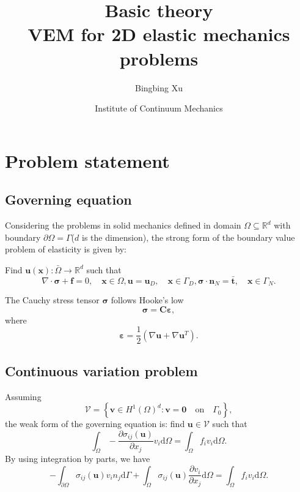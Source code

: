 \documentclass[kulak]{kulakarticle} %
\title{Basic theory\\ VEM for 2D elastic mechanics problems}
\author{Bingbing Xu}
\date{Institute of Continuum Mechanics}
\newcommand{\ud}{\mathrm{d}}
\begin{document}
\maketitle

\section{Problem statement}
\label{r5.s1}
\subsection{Governing equation}
Considering the problems in solid mechanics defined in domain $\Omega\subseteq\mathbb{R}^d$ with boundary $\partial\Omega=\Gamma$($d$ is the dimension),
the strong form of the boundary value problem of elasticity is given by:

Find $\bm{u}(\bm{x}):\bar{\Omega}\rightarrow\mathbb{R}^d$ such that
\begin{subequations}
    \begin{equation}
        \nabla\cdot\bm{\sigma}+\bm{f} = 0,\quad \bm{x}\in\Omega,
    \end{equation}
    \begin{equation}
        \bm{u}=\bm{u}_D,\quad\bm{x} \in\Gamma_{D},
    \end{equation}
    \begin{equation}
        \bm{\sigma}\cdot\bm{n}_N = \bar{\bm{t}},\quad\bm{x}\in\Gamma_{N}.
    \end{equation}
\end{subequations}

The Cauchy stress tensor $\bm{\sigma}$ follows Hooke's low 
\begin{equation}
    \bm{\sigma} = \bm{C}\bm{\varepsilon},
\end{equation}
where 
\begin{equation}
    \bm{\varepsilon} = \frac{1}{2}\left(\nabla\bm{u}+\nabla\bm{u}^T\right).
\end{equation}

\subsection{Continuous variation problem}
\label{r5.s1.2}
Assuming 
\begin{equation}
    \bm{\mathcal{V}} = \left\{\bm{v}\in H^1(\Omega)^d:\bm{v} = \bm{0}\quad \text{on}\quad \Gamma_0\right\},
\end{equation}
the weak form of the governing equation is: 
find $\bm{u}\in\bm{\mathcal{V}}$ such that 
\begin{equation}
    \int_\Omega-\frac{\partial\sigma_{ij}(\bm{u})}{\partial x_j}v_i\ud\Omega = \int_\Omega f_iv_i\ud\Omega.
\end{equation}
By using integration by parts, we have
\begin{equation}
    -\int_{\partial\Omega}\sigma_{ij}(\bm{u})v_in_j\ud\Gamma+\int_\Omega\sigma_{ij}(\bm{u})\frac{\partial v_i}{\partial x_j}\ud\Omega = \int_{\Omega}f_iv_i\ud\Omega.
\end{equation}
\end{document}
